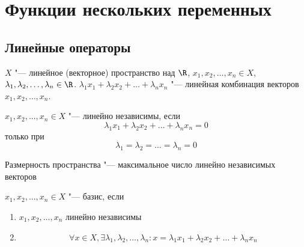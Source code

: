 \chapter{Функции нескольких переменных}
\section{Линейные операторы}

\begin{Def}
	$X$ "--- линейное (векторное) пространство над $\R$, $x_1, x_2, \dots, x_n \in X$, $\lambda_1, \lambda_2, \dots, \lambda_n \in \R$.
	$\lambda_1x_1 + \lambda_2x_2 + \dots + \lambda_nx_n$ "--- линейная комбинация векторов $x_1, x_2, \dots, x_n$.
\end{Def}

\begin{Def}
	$x_1, x_2, ..., x_n \in X$ "--- линейно независимы, если
	\[ \lambda_1x_1 + \lambda_2x_2 + \dots + \lambda_nx_n = 0 \]
	только при
	\[ \lambda_1 = \lambda_2 = \dots = \lambda_n = 0 \]
\end{Def}

\begin{Def}
	Размерность пространства "--- максимальное число линейно независимых векторов
\end{Def}

\begin{Def}
	$x_1, x_2, ..., x_n \in X$ "--- базис, если
	\begin{enumerate}
	\item
		$x_1, x_2, ..., x_n$ линейно независимы
	\item
		\[ \forall x \in X, \exists \lambda_1, \lambda_2, \dots, \lambda_n \colon x = \lambda_1x_1 + \lambda_2x_2 + \dots + \lambda_nx_n \]
	\end{enumerate}
\end{Def}

